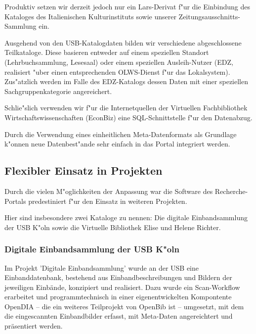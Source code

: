 \documentclass[11pt, twoside, a4paper, BCOR8mm, DIV12, bibtotoc,idxtotoc]{scrbook}
\begin{document}
\begin{itemize}
Produktiv setzen wir derzeit jedoch nur ein Lars-Derivat f"ur die
Einbindung des Kataloges des Italienischen Kulturinstituts sowie
unserer Zeitungsausschnitts-Sammlung ein.


Ausgehend von den USB-Katalogdaten bilden wir verschiedene
abgeschlossene Teilkataloge. Diese basieren entweder auf einem
speziellen Standort (Lehrbuchsammlung, Lesesaal) oder einem speziellen
Ausleih-Nutzer (EDZ, realisiert "uber einen entsprechenden OLWS-Dienst
f"ur das Lokalsystem). Zus"atzlich werden im Falle des EDZ-Katalogs
dessen Daten mit einer speziellen Sachgruppenkategorie angereichert.

Schlie"slich verwenden wir f"ur die Internetquellen der Virtuellen
Fachbibliothek Wirtschaftswissenschaften (EconBiz) eine
SQL-Schnittstelle f"ur den Datenabzug.

Durch die Verwendung eines einheitlichen Meta-Datenformats als
Grundlage k"onnen neue Datenbest"ande sehr einfach in das Portal
integriert werden.


\subsection{Flexibler Einsatz in Projekten}

Durch die vielen M"oglichkeiten der Anpassung war die Software des
Recherche-Portals predestiniert f"ur den Einsatz in weiteren
Projekten\cite{FlimmHoffJB:06}.

Hier sind insbesondere zwei Kataloge zu nennen: Die digitale
Einbandsammlung der USB K"oln sowie die Virtuelle Bibliothek Elise und
Helene Richter.


\subsubsection{Digitale Einbandsammlung der USB K"oln}

Im Projekt 'Digitale Einbandsammlung' wurde an der USB eine
Einbanddatenbank, bestehend aus Einbandbeschreibungen und Bildern der
jeweiligen Einbände, konzipiert und realisiert. Dazu wurde ein
Scan-Workflow erarbeitet und programmtechnisch in einer
eigenentwickelten Kompontente OpenDIA -- die ein weiteres Teilprojekt
von OpenBib ist -- umgesetzt, mit dem die eingescannten Einbandbilder
erfasst, mit Meta-Daten angereichtert und präsentiert werden.


\end{itemize}
\end{document}
